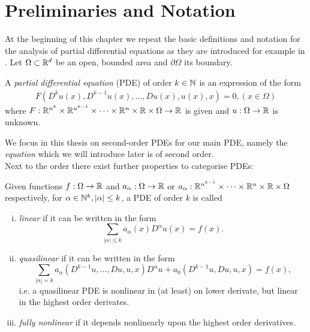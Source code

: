\section{ Preliminaries and Notation}
At the beginning of this chapter we repeat the basic definitions and notation for the analysis of partial differential equations as they are introduced for example in \cite[Introduction]{Evans1998}.
Let $\Omega \subset \mathbb{R}^d $ be an open, bounded area and $\partial \Omega$ its boundary.
\begin{definition}
 A \emph{partial differential equation} (PDE) of order $k\in \mathbb{N}$ is an expression of the form
\begin{align}
	F(D^k u(x), D^{k-1}u(x), \dots, Du(x), u(x), x) = 0, (x \in \Omega)\label{eq:general PDE}
\end{align}
where $F:\mathbb{R}^{n^k} \times \mathbb{R}^{n^{k-1}} \times \dots \times \mathbb{R}^n \times \mathbb{R} \times \Omega \rightarrow \mathbb{R} $ is given and $u:\Omega \rightarrow \mathbb{R}$ is unknown.
\end{definition}
We focus in this thesis on second-order PDEs for our main PDE, namely the \emph{\MA equation} which we will introduce later is of second order. 
\\Next to the order there exist further properties to categorise PDEs:
\begin{definition} \label{def: categories of PDEs}
	Given functions  $f:\Omega \rightarrow \mathbb{R}$ and $a_{\alpha}:\Omega \rightarrow \mathbb{R}$ or $a_{\alpha}:\mathbb{R}^{n^{k-1}} \times \dots \times \mathbb{R}^n \times \mathbb{R} \times \Omega$ respectively, for $\alpha \in \mathbb{N}^{k}, |\alpha| \leq k$, a PDE of order $k$ is called
	\begin{enumerate}[(i)]
		\item \emph{linear} if it can be written in the form
		\[
			\sum_{|\alpha| \leq k} a_{\alpha} (x) D^{\alpha} u(x) = f(x).
		\] 
		
		
		\item \emph{quasilinear} if it can be written in the form
		\[
			\sum_{|\alpha| = k} a_{\alpha}(D^{k-1}u, \dots, Du, u, x) D^{\alpha} u + a_0(D^{k-1}u, Du, u, x)= f(x),
		\]	
		i.e. a quasilinear PDE is nonlinear in (at least) on lower derivate, but linear in the highest order derivates.
		
		\item \emph{fully nonlinear} if it depends nonlinearly upon the highest order derivatives.
	\end{enumerate}
\end{definition}
